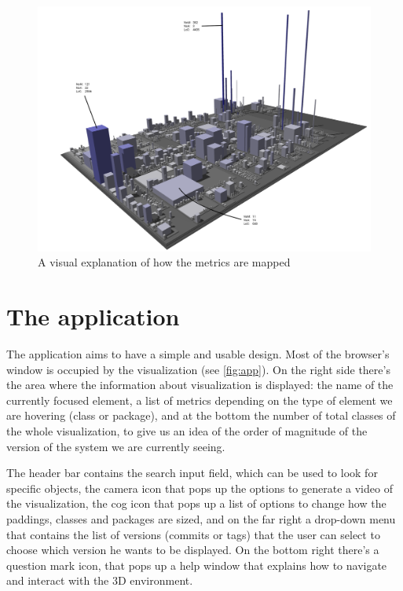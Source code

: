 \documentclass[]{usiinfbachelorproject}
\begin{document}
\begin{figure} [H]
\centering
\includegraphics[width=1\textwidth]{pictures/metrics.png}
\caption{A visual explanation of how the metrics are mapped}
\label{fig:metrics}
\end{figure}



\section{The application} \label{WebCity}

The application aims to have a simple and usable design. Most of the browser's window is occupied by the visualization (see \ref{fig:app}). On the right side there's the area where the information about visualization is displayed: the name of the currently focused element, a list of metrics depending on the type of element we are hovering (class or package),
and at the bottom the number of total classes of the whole visualization, to give us an idea of the order of magnitude of the version of the system we are currently seeing.

The header bar contains the search input field, which can be used to look for specific objects, the camera icon that pops up the options to generate a video of the visualization, the cog icon that pops up a list of options to change how the paddings, classes and packages are sized, and on the far right a drop-down menu that contains the list of versions (commits or tags) that the user can select to choose which version he wants to be displayed.
On the bottom right there's a question mark icon, that pops up a help window that explains how to navigate and interact with the 3D environment.
\end{document}
